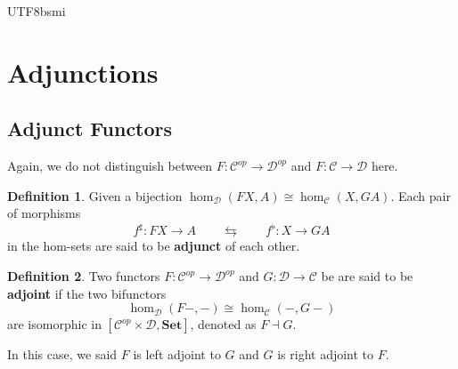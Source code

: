 \documentclass[12pt]{article}
\theoremstyle{definition}
\newtheorem{definition}{Definition}[section]
\newcommand\<{\langle}
\renewcommand\>{\rangle}
\begin{document}
\begin{CJK}{UTF8}{bsmi}
\section{Adjunctions}

\subsection{Adjunct Functors}

Again, we do not distinguish between $F:\mathcal{C}^{op}\to\mathcal{D}^{op}$ and $F:\mathcal{C}\to\mathcal{D}$ here.

\begin{definition}
    Given a bijection $\hom_\mathcal{D}(FX, A)\cong\hom_\mathcal{C}(X, GA)$.
    Each pair of morphisms $$f^\sharp:FX\to A\qquad\leftrightarrows\qquad f^\flat:X\to GA$$ in the hom-sets are said to be \textbf{adjunct} of each other.
\end{definition}

\begin{definition}
    Two functors $F:\mathcal{C}^{op}\to\mathcal{D}^{op}$ and $G:\mathcal{D}\to\mathcal{C}$ be are said to be \textbf{adjoint} if the two bifunctors
    \[
        \hom_\mathcal{D}(F-, -)\cong \hom_\mathcal{C}(-, G-)
    \]
    are isomorphic in $[\mathcal{C}^{op}\times\mathcal{D}, \textbf{Set}]$, denoted as $F\dashv G$.
        \begin{center}
        \end{center}
    In this case, we said $F$ is left adjoint to $G$ and $G$ is right adjoint to $F$.
\end{definition}


\end{CJK}
\end{document}
